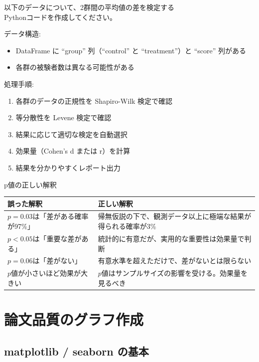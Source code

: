 \begin{promptbox}
以下のデータについて、2群間の平均値の差を検定する\\
Pythonコードを作成してください。

データ構造:
\begin{itemize}
\item DataFrame に ``group'' 列（``control'' と ``treatment''）と ``score'' 列がある
\item 各群の被験者数は異なる可能性がある
\end{itemize}

処理手順:
\begin{enumerate}
\item 各群のデータの正規性を Shapiro-Wilk 検定で確認
\item 等分散性を Levene 検定で確認
\item 結果に応じて適切な検定を自動選択
\item 効果量（Cohen's d または r）を計算
\item 結果を分かりやすくレポート出力
\end{enumerate}
\end{promptbox}

\begin{itembox}[l]{p値の正しい解釈}
\begin{table}[H]
\centering
\begin{tabular}{p{4.5cm}p{5cm}}
\toprule
誤った解釈 & 正しい解釈 \\
\midrule
$p = 0.03$は「差がある確率が97\%」 & 帰無仮説の下で、観測データ以上に極端な結果が得られる確率が3\% \\
$p < 0.05$は「重要な差がある」 & 統計的に有意だが、実用的な重要性は効果量で判断 \\
$p = 0.06$は「差がない」 & 有意水準を超えただけで、差がないとは限らない \\
$p$値が小さいほど効果が大きい & $p$値はサンプルサイズの影響を受ける。効果量を見るべき \\
\bottomrule
\end{tabular}
\end{table}
\end{itembox}

\section{論文品質のグラフ作成}

\subsection{matplotlib / seaborn の基本}


